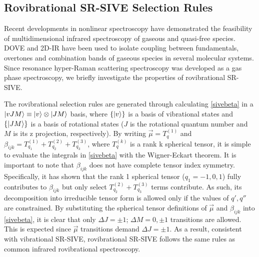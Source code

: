 \documentclass[aip, jcp, reprint, onecolumn]{revtex4-2}
\begin{document}
\subsection{Rovibrational SR-SIVE Selection Rules} %
Recent developments in nonlinear spectroscopy have demonstrated the feasibility of multidimensional infrared spectroscopy of gaseous and quasi-free species. \cite{Ziegler2018, Gronborg2022, RN325, Chen2024}
DOVE and 2D-IR have been used to isolate coupling between fundamentals, overtones and combination bands of gaseous species in several molecular systems. 
Since resonance hyper-Raman scattering spectroscopy was developed as a gas phase spectroscopy, we briefly investigate the properties of rovibrational SR-SIVE.\cite{Ziegler1987}

The rovibrational selection rules are generated through calculating \autoref{sivebeta} in a $\ket{vJM} \equiv \ket{v} \otimes {\ket{JM}}$ basis, where $\{\ket{v}\}$ is a basis of vibrational states and $\{\ket{JM}\}$ is a basis of rotational states ($J$ is the rotational quantum number and $M$ is its z projection, respectively).
By writing $\vec{\mu} = T_q^{(1)}$ and $\beta_{ijk} = T_{q_1}^{(1)} + T_{q_2}^{(2)} + T_{q_3}^{(3)}$, where $T^{(k)}_{q}$ is a rank k spherical tensor, it is simple to evaluate the integrals in \autoref{sivebeta} with the Wigner-Eckart theorem. \cite{Kowzan2022}
It is important to note that $\beta_{ijk}$ does not have complete tensor index symmetry.
Specifically, it has shown that the rank 1 spherical tensor ($q_1 = -1, 0 ,1$) fully contributes to $\beta_{ijk}$ but only select $T_{q_2}^{(2)} + T_{q_3}^{(3)}$ terms contribute. \cite{Andrews1978, Andrews1990}
As such, its decomposition into irreducible tensor form is allowed only if the values of $q', q''$ are constrained.
By substituting the spherical tensor definitions of $\vec{\mu}$ and $\beta_{ijk}$ into \autoref{sivebeta}, it is clear that only $\Delta J = \pm 1$; $\Delta M = 0, \pm1$ transitions are allowed.
This is expected since $\vec{\mu}$ transitions demand $\Delta J = \pm 1$.
As a result, consistent with vibrational SR-SIVE, rovibrational SR-SIVE follows the same rules as common infrared rovibrational spectroscopy.
\end{document}
